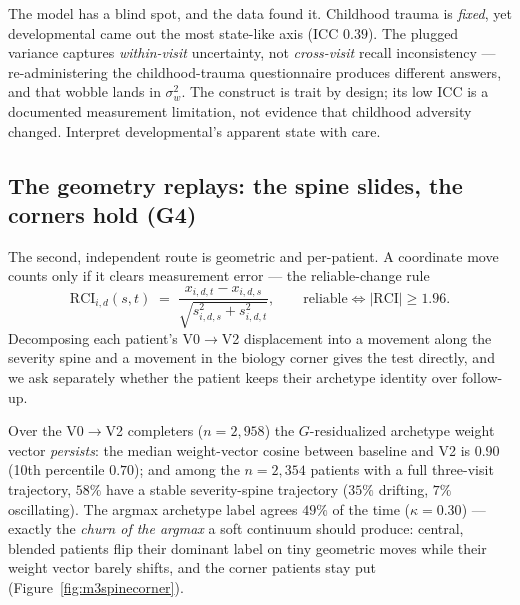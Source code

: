 \begin{caveatbox}
The model has a blind spot, and the data found it. Childhood trauma is \emph{fixed}, yet developmental came out
the most state-like axis (ICC $0.39$). The plugged variance captures \emph{within-visit} uncertainty, not
\emph{cross-visit} recall inconsistency --- re-administering the childhood-trauma questionnaire produces
different answers, and that wobble lands in $\sigma^2_w$. The construct is trait by design; its low ICC is a
documented measurement limitation, not evidence that childhood adversity changed. Interpret developmental's
apparent state with care.
\end{caveatbox}

\subsection{The geometry replays: the spine slides, the corners hold (G4)}
\label{sub:spinecorner}
The second, independent route is geometric and per-patient. A coordinate move counts only if it clears
measurement error --- the reliable-change rule
\begin{equation}
\label{eq:rci}
\mathrm{RCI}_{i,d}(s,t)\;=\;\frac{x_{i,d,t}-x_{i,d,s}}{\sqrt{s^2_{i,d,s}+s^2_{i,d,t}}},\qquad
\text{reliable}\iff |\mathrm{RCI}|\ge 1.96 .
\end{equation}
Decomposing each patient's V0$\to$V2 displacement into a movement along the severity spine and a movement in
the biology corner gives the test directly, and we ask separately whether the patient keeps their archetype
identity over follow-up.

\begin{keyresult}
Over the V0$\to$V2 completers ($n=2{,}958$) the $G$-residualized archetype weight vector \emph{persists}: the
median weight-vector cosine between baseline and V2 is $0.90$ (10th percentile $0.70$); and among the $n=2{,}354$ patients with a full three-visit trajectory, $58\%$
have a stable severity-spine trajectory ($35\%$ drifting, $7\%$ oscillating). The argmax archetype label agrees
$49\%$ of the time ($\kappa=0.30$) --- exactly the \emph{churn of the argmax} a soft continuum should produce:
central, blended patients flip their dominant label on tiny geometric moves while their weight vector barely
shifts, and the corner patients stay put (Figure~\ref{fig:m3spinecorner}).
\end{keyresult}

